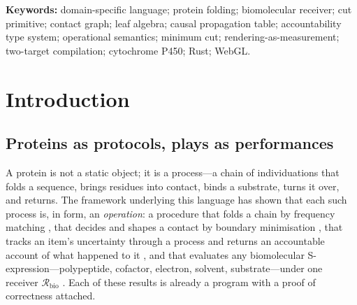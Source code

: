 \documentclass[11pt,a4paper]{article}
\theoremstyle{thmstyle}
\theoremstyle{definition}
\theoremstyle{remark}
\newcommand{\Recv}{\mathcal{R}_{\mathrm{bio}}}
\newcommand{\shk}[1]{\texttt{#1}}
\begin{document}
\begin{abstract}
admissibility, path opacity, and representation mobility;
\shk{catalyze}$\to$the catalytic cycle under the Miracle Principle;
\shk{mutate}$\to$re-cut of the coupling graph; \shk{complete}$\to$
trajectory completion from partial omics); and (vi)~a two-target
compilation model. Shakespeare compiles, from one typed front end and one
back-end-agnostic Cut-IR, to a Rust reference runtime in which cuts are
exact maximum-flow minimum cuts, and to a WebGL\,2 runtime---the online
Shakespeare tool---in which cuts are GPU render passes and the framebuffer
that results \emph{is} the measurement. We prove the two back ends are
observationally equivalent up to the floor. Worked plays fold crambin,
run the seven-state cytochrome CYP3A4 catalytic cycle (with the Miracle
Principle licensing the transient Compound~I), and score a point mutation.
The protein is a protocol; a Shakespeare program is its performance.
\end{abstract}

\noindent\textbf{Keywords:} domain-specific language; protein folding;
biomolecular receiver; cut primitive; contact graph; leaf algebra;
causal propagation table; accountability type system; operational
semantics; minimum cut; rendering-as-measurement; two-target compilation;
cytochrome P450; Rust; WebGL.

\tableofcontents

\section{Introduction}
\label{sec:intro}

\subsection{Proteins as protocols, plays as performances}

A protein is not a static object; it is a process---a chain of
individuations that folds a sequence, brings residues into contact,
binds a substrate, turns it over, and returns. The framework underlying
this language has shown that each such process is, in form, an
\emph{operation}: a procedure that folds a chain by frequency matching
\citep{sachikonye2025fold}, that decides and shapes a contact by boundary
minimisation \citep{sachikonye2025chem}, that tracks an item's
uncertainty through a process and returns an accountable account of what
happened to it \citep{sachikonye2025causal}, and that evaluates any
biomolecular S-expression---polypeptide, cofactor, electron, solvent,
substrate---under one receiver $\Recv$ \citep{sachikonye2025expralg}. Each
of these results is already a program with a proof of correctness
attached.
\end{document}
